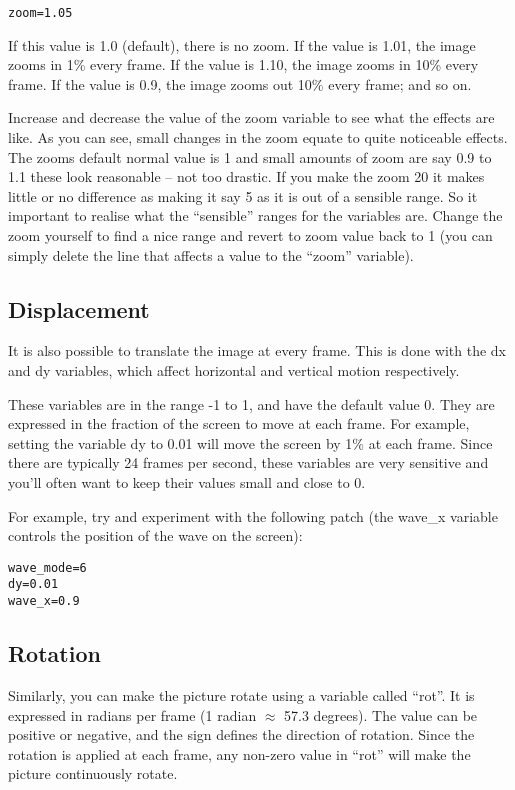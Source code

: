 \documentclass[11pt, a5paper, pagesize]{scrbook}
\begin{document}
\begin{verbatim}
zoom=1.05
\end{verbatim}

If this value is 1.0 (default), there is no zoom. If the value is 1.01, the image zooms in 1\% every frame. If the value is 1.10, the image zooms in 10\% every frame. If the value is 0.9, the image zooms out 10\% every frame; and so on.

Increase and decrease the value of the zoom variable to see what the effects are like. As you can see, small changes in the zoom equate to quite noticeable effects. The zooms default normal value is 1 and small amounts of zoom are say 0.9 to 1.1 these look reasonable -- not too drastic. If you make the zoom 20 it makes little or no difference as making it say 5 as it is out of a sensible range. So it important to realise what the ``sensible'' ranges for the variables are. Change the zoom yourself to find a nice range and revert to zoom value back to 1 (you can simply delete the line that affects a value to the ``zoom'' variable).

\subsection{Displacement}
It is also possible to translate the image at every frame. This is done with the dx and dy variables, which affect horizontal and vertical motion respectively.

These variables are in the range -1 to 1, and have the default value 0. They are expressed in the fraction of the screen to move at each frame. For example, setting the variable dy to 0.01 will move the screen by 1\% at each frame. Since there are typically 24 frames per second, these variables are very sensitive and you'll often want to keep their values small and close to 0.

For example, try and experiment with the following patch (the wave\_x variable controls the position of the wave on the screen):
\begin{verbatim}
wave_mode=6
dy=0.01
wave_x=0.9
\end{verbatim}

\subsection{Rotation}
Similarly, you can make the picture rotate using a variable called ``rot''. It is expressed in radians per frame (1 radian $\approx$ 57.3 degrees). The value can be positive or negative, and the sign defines the direction of rotation. Since the rotation is applied at each frame, any non-zero value in ``rot'' will make the picture continuously rotate.
\end{document}
